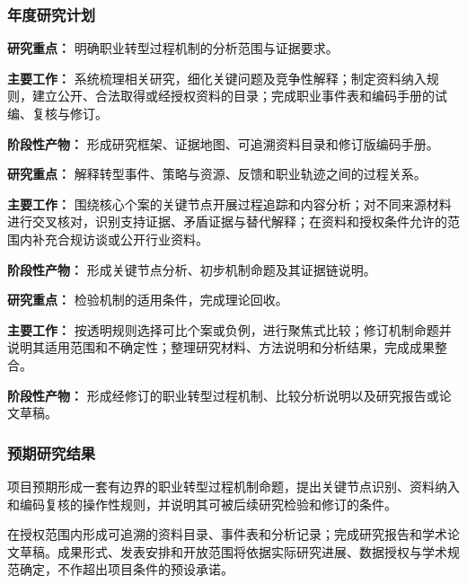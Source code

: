 \justifying
\NSFCBodyText

\subsubsection{年度研究计划}

\noindent\textbf{研究重点：} 明确职业转型过程机制的分析范围与证据要求。

\noindent\textbf{主要工作：} 系统梳理相关研究，细化关键问题及竞争性解释；制定资料纳入规则，建立公开、合法取得或经授权资料的目录；完成职业事件表和编码手册的试编、复核与修订。

\noindent\textbf{阶段性产物：} 形成研究框架、证据地图、可追溯资料目录和修订版编码手册。

\noindent\textbf{研究重点：} 解释转型事件、策略与资源、反馈和职业轨迹之间的过程关系。

\noindent\textbf{主要工作：} 围绕核心个案的关键节点开展过程追踪和内容分析；对不同来源材料进行交叉核对，识别支持证据、矛盾证据与替代解释；在资料和授权条件允许的范围内补充合规访谈或公开行业资料。

\noindent\textbf{阶段性产物：} 形成关键节点分析、初步机制命题及其证据链说明。

\noindent\textbf{研究重点：} 检验机制的适用条件，完成理论回收。

\noindent\textbf{主要工作：} 按透明规则选择可比个案或负例，进行聚焦式比较；修订机制命题并说明其适用范围和不确定性；整理研究材料、方法说明和分析结果，完成成果整合。

\noindent\textbf{阶段性产物：} 形成经修订的职业转型过程机制、比较分析说明以及研究报告或论文草稿。

\subsubsection{预期研究结果}

项目预期形成一套有边界的职业转型过程机制命题，提出关键节点识别、资料纳入和编码复核的操作性规则，并说明其可被后续研究检验和修订的条件。

在授权范围内形成可追溯的资料目录、事件表和分析记录；完成研究报告和学术论文草稿。成果形式、发表安排和开放范围将依据实际研究进展、数据授权与学术规范确定，不作超出项目条件的预设承诺。
